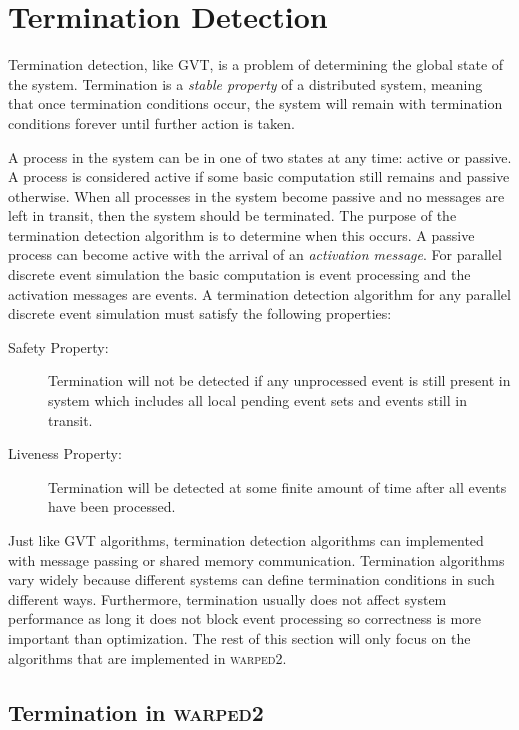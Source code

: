 \documentclass[11pt]{book}
\begin{document}
\section{Termination Detection}

Termination detection, like GVT, is a problem of determining the global state of the system.
Termination is a \emph{stable property} of a distributed system, meaning that once termination
conditions occur, the system will remain with termination conditions forever until further
action is taken.

A process in the system can be in one of two states at any time: active or passive. A process
is considered active if some basic computation still remains and passive otherwise.
When all processes in the system become passive and no messages are left in transit, then
the system should be terminated. The purpose of the termination detection algorithm is to
determine when this occurs. A passive process can become active with the arrival of an
\emph{activation message}. For parallel discrete event simulation the basic computation is
event processing and the activation messages are events. A termination detection algorithm for
any parallel discrete event simulation must satisfy the following properties:

\begin{description}
    \item[Safety Property:] Termination will not be detected if any unprocessed event is still
        present in system which includes all local pending event sets and events still in transit.
    \item[Liveness Property:] Termination will be detected at some finite amount of time after
        all events have been processed.
\end{description}

Just like GVT algorithms, termination detection algorithms can implemented with message
passing or shared memory communication. Termination algorithms vary widely because different
systems can define termination conditions in such different ways. Furthermore, termination
usually does not affect system performance as long it does not block event processing so
correctness is more important than optimization. The rest of this section will only focus
on the algorithms that are implemented in \textsc{warped2}.

\subsection{Termination in \textsc{warped2}}
\end{document}
